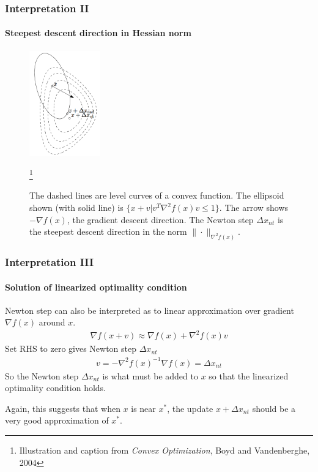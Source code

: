 \documentclass{beamer}
\begin{document}
\begin{frame}
\frametitle{Interpretation II}
\framesubtitle{Steepest descent direction in Hessian norm}
\begin{figure}
    \includegraphics[width=1.2in]{steepest.png}
\caption{ \footnotesize
The dashed lines are level curves of a convex function. The ellipsoid shown
(with solid line) is $\{x + v | v^T \nabla^2 f(x) v \leq 1\}$. The arrow shows
$-\nabla f(x)$, the gradient descent direction. The Newton step $\Delta x_{nt}$ is the
steepest descent direction in the norm $\|\cdot \|_{\nabla^2 f(x)}$. 
} 
\label{fig:2}
\footnote{ \tiny
    Illustration and caption from \textit{Convex Optimization},  Boyd and Vandenberghe, 2004}
\end{figure}
\end{frame}
\begin{frame}
\frametitle{Interpretation III}
\framesubtitle{Solution of linearized optimality condition}
    Newton step can also be interpreted as 
    to linear approximation over gradient $\nabla f(x)$ around $x$.
    \begin{align}
        \nabla f(x+v) \approx \nabla f(x) + \nabla^2 f(x) v
    \end{align}
    Set RHS to zero gives Newton step $\Delta x_{nt}$
    \begin{align}
        v = - \nabla^2 f(x)^{-1} \nabla f(x) = \Delta x_{nt} 
    \end{align}
    So the Newton step $\Delta x_{nt}$ is what must be added to $x$ so that
    the linearized optimality condition holds. 

    Again, this suggests that when $x$ is near $x^{*}$, the update $x+\Delta
    x_{nt}$ should be a very good approximation of $x^{*}$.
\end{frame}
\end{document}

